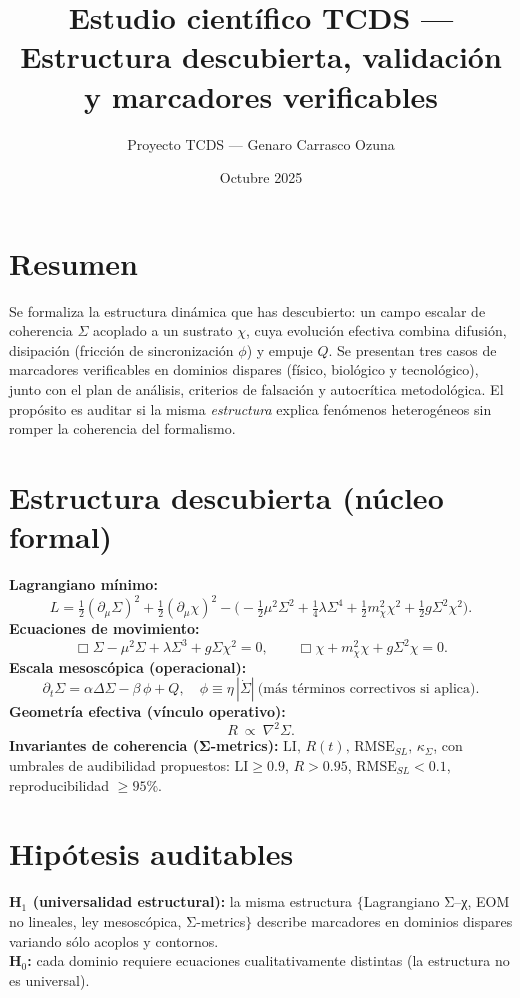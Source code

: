 \documentclass[12pt,a4paper]{article}
\title{\textbf{Estudio científico TCDS — Estructura descubierta, validación y marcadores verificables}}
\author{Proyecto TCDS — Genaro Carrasco Ozuna}
\date{Octubre 2025}
\begin{document}
\maketitle

\section*{Resumen}
Se formaliza la estructura dinámica que has descubierto: un campo escalar de coherencia \(\Sigma\) acoplado a un sustrato \(\chi\), cuya evolución efectiva combina difusión, disipación (fricción de sincronización \(\phi\)) y empuje \(Q\). Se presentan tres casos de marcadores verificables en dominios dispares (físico, biológico y tecnológico), junto con el plan de análisis, criterios de falsación y autocrítica metodológica. El propósito es auditar si la misma \emph{estructura} explica fenómenos heterogéneos sin romper la coherencia del formalismo.

\section{Estructura descubierta (núcleo formal)}
\textbf{Lagrangiano mínimo:}
\[
L=\tfrac12(\partial_\mu\Sigma)^2+\tfrac12(\partial_\mu\chi)^2-\Big(-\tfrac12\mu^2\Sigma^2+\tfrac14\lambda\Sigma^4+\tfrac12 m_\chi^2\chi^2+\tfrac12 g\Sigma^2\chi^2\Big).
\]
\textbf{Ecuaciones de movimiento:}
\[
\Box\Sigma-\mu^2\Sigma+\lambda\Sigma^3+g\Sigma\chi^2=0,\qquad
\Box\chi+m_\chi^2\chi+g\Sigma^2\chi=0.
\]
\textbf{Escala mesoscópica (operacional):}
\[
\partial_t \Sigma=\alpha\Delta\Sigma-\beta\,\phi+Q, \quad \phi\equiv \eta\,|\dot\Sigma| \ \text{(más términos correctivos si aplica)}.
\]
\textbf{Geometría efectiva (vínculo operativo):}
\[
R\ \propto\ \nabla^2\Sigma.
\]
\textbf{Invariantes de coherencia (Σ-metrics):} \(\mathrm{LI},\,R(t),\,\mathrm{RMSE}_{\!SL},\,\kappa_\Sigma\), con umbrales de audibilidad propuestos: \(\mathrm{LI}\ge 0.9\), \(R>0.95\), \(\mathrm{RMSE}_{\!SL}<0.1\), reproducibilidad \(\ge 95\%\).

\section{Hipótesis auditables}
\textbf{H\(_1\) (universalidad estructural):} la misma estructura \(\{\)Lagrangiano Σ–χ, EOM no lineales, ley mesoscópica, Σ-metrics\(\}\) describe marcadores en dominios dispares variando sólo acoplos y contornos. \\
\textbf{H\(_0\):} cada dominio requiere ecuaciones cualitativamente distintas (la estructura no es universal).
\end{document}

